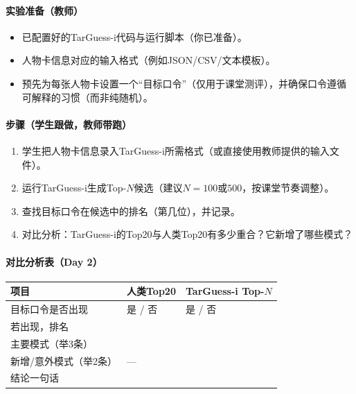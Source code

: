 \documentclass[UTF8,a4paper,12pt]{ctexart}
\begin{document}
\paragraph{实验准备（教师）}
\begin{itemize}
  \item 已配置好的TarGuess-i代码与运行脚本（你已准备）。
  \item 人物卡信息对应的输入格式（例如JSON/CSV/文本模板）。
  \item 预先为每张人物卡设置一个``目标口令''（仅用于课堂测评），并确保口令遵循可解释的习惯（而非纯随机）。
\end{itemize}

\paragraph{步骤（学生跟做，教师带跑）}
\begin{enumerate}
  \item 学生把人物卡信息录入TarGuess-i所需格式（或直接使用教师提供的输入文件）。
  \item 运行TarGuess-i生成Top-$N$候选（建议$N=100$或$500$，按课堂节奏调整）。
  \item 查找目标口令在候选中的排名（第几位），并记录。
  \item 对比分析：TarGuess-i的Top20与人类Top20有多少重合？它新增了哪些模式？
\end{enumerate}

\paragraph{对比分析表（Day 2）}
\begin{longtable}{@{}p{}p{}p{}@{}}
\toprule
\textbf{项目} & \textbf{人类Top20} & \textbf{TarGuess-i Top-$N$} \\
\midrule
\endhead
目标口令是否出现 & 是 / 否 & 是 / 否 \\
若出现，排名 & \underline{\hspace{10em}} & \underline{\hspace{10em}} \\
主要模式（举3条） & \underline{\hspace{16em}} & \underline{\hspace{16em}} \\
新增/意外模式（举2条） & --- & \underline{\hspace{16em}} \\
结论一句话 & \multicolumn{2}{p{0.72\textwidth}}{\underline{\hspace{30em}}} \\
\bottomrule
\end{longtable}
\end{document}
